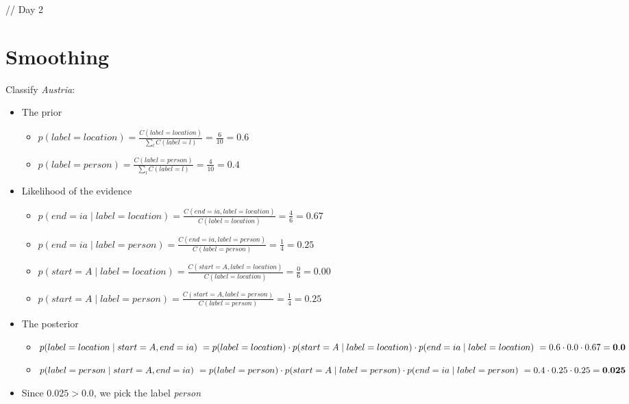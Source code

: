 \documentclass[11pt,letterpaper]{article}
\begin{document}
// Day 2

\section{Smoothing}

Classify \textit{Austria}:
\begin{itemize}
  \item The prior
    \begin{itemize}
      \item $p(label=location) = \frac{C(label=location)}{\sum_l C(label=l)} = \frac{6}{10} = 0.6$
      \item $p(label=person) = \frac{C(label=person)}{\sum_l C(label=l)} = \frac{4}{10} = 0.4$
    \end{itemize}
  \item Likelihood of the evidence
    \begin{itemize}
      \item $p(end=ia \mid label=location) = \frac{C(end=ia, label=location)}{C(label=location)} = \frac{4}{6} = 0.67$
      \item $p(end=ia \mid label=person) = \frac{C(end=ia, label=person)}{C(label=person)} = \frac{1}{4} = 0.25$
      \\
      \item $p(start=A \mid label=location) = \frac{C(start=A, label=location)}{C(label=location)} = \frac{0}{6} = 0.00$
      \item $p(start=A \mid label=person) = \frac{C(start=A, label=person)}{C(label=person)} = \frac{1}{4} = 0.25$
    \end{itemize}
  \item The posterior
    \begin{itemize}
      \item $p(label=location \mid start=A, end=ia) \\
            ~ = p(label=location) \cdot p(start=A \mid label=location) \cdot p(end=ia \mid label=location) \\
            ~ = 0.6 \cdot 0.0 \cdot 0.67 = \mathbf{0.0}$
      \item $p(label=person \mid start=A, end=ia) \\
            ~ = p(label=person) \cdot p(start=A \mid label=person) \cdot p(end=ia \mid label=person) \\
            ~ = 0.4 \cdot 0.25 \cdot 0.25 = \mathbf{0.025}$
    \end{itemize}
  \item Since $0.025 > 0.0$, we pick the label \textit{person}

\end{itemize}
\end{document}
